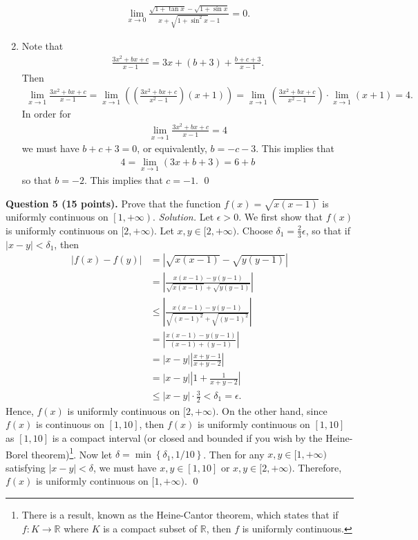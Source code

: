 \documentclass[11pt]{amsart}
\theoremstyle{plain}
\numberwithin{equation}{section}
\begin{document}
\begin{enumerate}[label=\textbf{(\roman*)}]
\begin{align*}
    \lim_{x\to0}\frac{\sqrt{1+\tan x}-\sqrt{1+\sin x}}{x+\sqrt{1+\sin^{2}x}-1}=0.
\end{align*}
\item Note that
\begin{align*}
    \frac{3x^{2}+bx+c}{x-1}=3x+(b+3)+\frac{b+c+3}{x-1}.
\end{align*}
Then
\begin{align*}
    \lim_{x\to 1}\frac{3x^{2}+bx+c}{x-1}=\lim_{x\to1}\left(\left(\frac{3x^{2}+bx+c}{x^{2}-1}\right)\left(x+1\right)\right)=\lim_{x\to1}\left(\frac{3x^{2}+bx+c}{x^{2}-1}\right)\cdot\lim_{x\to 1}\left(x+1\right)=4.
\end{align*}
In order for 
\begin{align*}
    \lim_{x\to 1}\frac{3x^{2}+bx+c}{x-1}=4
\end{align*}
we must have $b+c+3=0$, or equivalently, $b=-c-3$. This implies that
\begin{align*}
    4=\lim_{x\to1}\left(3x+b+3\right)=6+b
\end{align*}
so that $b=-2$. This implies that $c=-1$.  \qed 
\end{enumerate}
\noindent\textbf{Question 5 (15 points).} Prove that the function $f(x)=\sqrt{x(x-1)}$ is uniformly continuous on $\left[1,+\infty\right)$. 
\newline
\newline\textit{Solution.} Let $\epsilon>0$. We first show that $f(x)$ is uniformly continuous on $[2,+\infty)$. Let $x,y\in[2,+\infty)$. Choose $\delta_{1}=\frac{2}{3}\epsilon$, so that if $|x-y|<\delta_{1}$, then
\begin{align*}
\left|f(x)-f(y)\right|&=\left|\sqrt{x(x-1)}-\sqrt{y(y-1)}\right|
\\
&=\left|\frac{x(x-1)-y(y-1)}{\sqrt{x(x-1)}+\sqrt{y(y-1)}}\right|
\\
&\leq\left|\frac{x(x-1)-y(y-1)}{\sqrt{(x-1)^{2}}+\sqrt{(y-1)^{2}}}\right|
\\
&=\left|\frac{x(x-1)-y(y-1)}{(x-1)+(y-1)}\right|
\\
&=|x-y|\left|\frac{x+y-1}{x+y-2}\right|
\\
&=|x-y|\left|1+\frac{1}{x+y-2}\right|
\\
&\leq|x-y|\cdot \frac{3}{2}<\delta_{1}=\epsilon.
\end{align*}
Hence, $f(x)$ is uniformly continuous on $[2,+\infty)$. On the other hand, since $f(x)$ is continuous on $[1,10]$, then $f(x)$ is uniformly continuous on $[1,10]$ as $[1,10]$ is a compact interval (or closed and bounded if you wish by the Heine-Borel theorem)\footnote{There is a result, known as the Heine-Cantor theorem, which states that if $f:K\to\mathbb{R}$ where $K$ is a compact subset of $\mathbb{R}$, then $f$ is uniformly continuous.}. Now let $\delta=\min\left\{\delta_{1},1/10\right\}$. Then for any $x,y\in[1,+\infty)$ satisfying $|x-y|<\delta$, we must have $x,y\in[1,10]$ or $x,y\in[2,+\infty)$. Therefore, $f(x)$ is uniformly continuous on $[1,+\infty)$. \qed 
\end{document}

